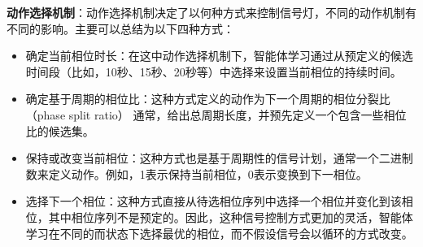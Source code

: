 \textbf{动作选择机制}：动作选择机制决定了以何种方式来控制信号灯，不同的动作机制有不同的影响。主要可以总结为以下四种方式：
\begin{itemize}
    \item 确定当前相位时长：在这中动作选择机制下，智能体学习通过从预定义的候选时间段（比如，10秒、15秒、20秒等）中选择来设置当前相位的持续时间。
    \item 确定基于周期的相位比：这种方式定义的动作为下一个周期的相位分裂比（phase split ratio） 通常，给出总周期长度，并预先定义一个包含一些相位比的候选集。
    \item 保持或改变当前相位：这种方式也是基于周期性的信号计划，通常一个二进制数来定义动作。例如，1表示保持当前相位，0表示变换到下一相位。
    \item 选择下一个相位：这种方式直接从待选相位序列中选择一个相位并变化到该相位，其中相位序列不是预定的。因此，这种信号控制方式更加的灵活，智能体学习在不同的而状态下选择最优的相位，而不假设信号会以循环的方式改变。
\end{itemize}


